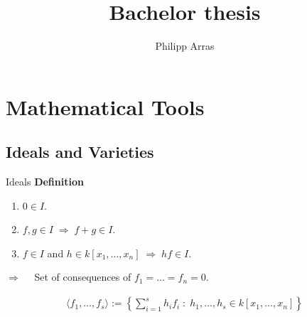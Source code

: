\documentclass[11pt]{beamer}
\author{Philipp Arras}
\title{Bachelor thesis}
\institute{Institute for Theoretical Physics Heidelberg}
\newcommand{\mvar}[2]{#1_1,\ldots , #1_{#2}}
\newcommand{\kxn}{k[\mvar{x}{n}]}
\begin{document}
\begin{frame}
\titlepage
\end{frame}

\begin{frame}
\tableofcontents
\end{frame}

\section{Mathematical Tools}
\subsection{Ideals and Varieties}
\begin{frame}{Ideals}
\textbf{Definition}
\begin{enumerate}
\item $0 \in I$.
\item $f,g\in I \;\Rightarrow \; f+g\in I$.
\item $f\in I$ and $h\in k[\mvar{x}{n}] \;\Rightarrow\; hf\in I$.
\end{enumerate}
$\Rightarrow\quad$ Set of consequences of $f_1 = \ldots = f_n = 0$. 

\begin{align*}
\langle \mvar{f}{s} \rangle := \left\lbrace \sum_{i=1}^s h_i f_i \; : \;  \mvar{h}{s} \in \kxn \right\rbrace
\end{align*}
\end{frame}

%
%
%
%
%
%
%

%
\end{document}
